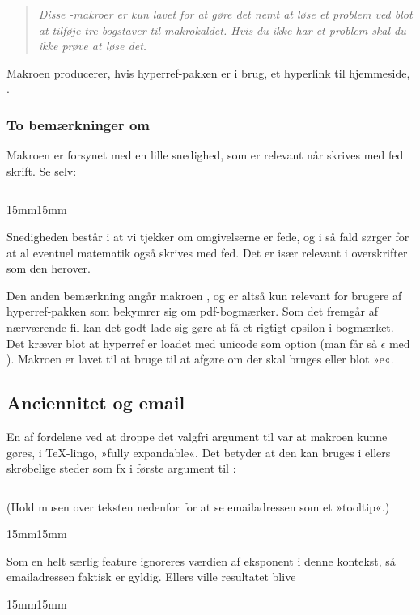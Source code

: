 \documentclass[a4paper,article,oneside,danish]{memoir}
\newcommand{\pakkenavn}[1]{\textsf{#1}}
\newcommand*{\optionname}[1]{\textcolor{option}{#1}}
\newenvironment{resultat}{%
  \begin{adjustwidth}{15mm}{15mm}%
    \begin{qshade}%
    }{%
    \end{qshade}%
  \end{adjustwidth}}
\begin{document}
\begin{quote}
  \itshape  Disse -makroer er kun lavet for at gøre det nemt at løse
  et problem ved blot at tilføje tre bogstaver til makrokaldet. Hvis
  du ikke har et problem skal du ikke prøve at løse det.
\end{quote}

Makroen  producerer, hvis \pakkenavn{hyperref}-pakken er i
brug, et hyperlink til \TKETs hjemmeside, \TKurl.

\subsubsection{To bemærkninger om \RemToRpdf}
\label{sec:bemarkn-om-remt}

Makroen  er forsynet med en lille snedighed, som er
relevant når \RemToR skrives med fed skrift. Se selv:
\inputminted{latex}{eksempel-RemToR.tex}

\begin{resultat}

\end{resultat}

Snedigheden består i at vi tjekker om omgivelserne er fede, og i så
fald sørger for at al eventuel matematik også skrives med fed. Det er
især relevant i overskrifter som den herover.

Den anden bemærkning angår makroen , og er altså kun
relevant for brugere af \pakkenavn{hyperref}-pakken som bekymrer sig
om pdf-bogmærker. Som det fremgår af nærværende fil kan det godt lade
sig gøre at få et rigtigt epsilon i bogmærket. Det kræver blot at
\pakkenavn{hyperref} er loadet med \optionname{unicode} som option
(man får så $\epsilon$ med ). Makroen 
er lavet til at bruge  til at afgøre om der skal
bruges  eller blot »e«.

\subsection{Anciennitet og email}
\label{sec:anciennitet-og-email}

En af fordelene ved at droppe det valgfri argument til 
var at makroen kunne gøres, i \TeX-lingo, »fully expandable«. Det
betyder at den kan bruges i ellers skrøbelige steder som fx i første
argument til :
\inputminted{latex}{eksempel-href.tex}
(Hold musen over teksten nedenfor for at se emailadressen som et »tooltip«.)
\begin{resultat}

\end{resultat}
Som en helt særlig feature ignoreres værdien af \optionname{eksponent}
i denne kontekst, så emailadressen faktisk er gyldig. Ellers ville
resultatet blive
\begin{resultat}

\end{resultat}
\end{document}
